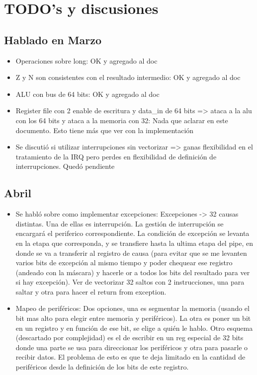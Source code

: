\section{TODO's y discusiones}
\subsection{Hablado en Marzo}
\begin{itemize}
 \item Operaciones sobre long: OK y agregado al doc
 \item Z y N son consistentes con el resultado intermedio: OK y agregado al doc
 \item ALU con bus de 64 bits: OK y agregado al doc
 \item Register file con 2 enable de escritura y data\_in de 64 bits => ataca a la alu con los 64 bits y ataca a la memoria con 32: Nada
 que aclarar en este documento. Esto tiene más que ver con la implementación
 \item Se discutió si utilizar interrupciones sin vectorizar => ganas flexibilidad en el tratamiento de la IRQ pero perdes en
 flexibilidad de definición de interrupciones. Quedó pendiente
\end{itemize}

\subsection{Abril}
\begin{itemize}
 \item Se habló sobre como implementar excepciones:
 Excepciones -> 32 causas distintas. Una de ellas es interrupción. La gestión de interrupción se encargará el periferico correspondiente.
La condición de excepción se levanta en la etapa que corresponda, y se transfiere hasta la ultima etapa del pipe, en donde se va a
transferir al registro de causa (para evitar que se me levanten varios bits de excepción al mismo tiempo y poder chequear ese registro
(andeado con la máscara) y hacerle or a todos los bits del resultado para ver si hay excepción).
Ver de vectorizar 32 saltos con 2 instrucciones, una para saltar y otra para hacer el return from exception.
 \item Mapeo de periféricos: Dos opciones, una es segmentar la memoria (usando el bit mas alto para elegir entre memoria y periféricos).
La otra es poner un bit en un registro y en función de ese bit, se elige a quién le hablo. Otro esquema (descartado por complejidad) es
el de escribir en un reg especial de 32 bits donde una parte se usa para direccionar los periféricos y otra para pasarle o recibir datos.
El problema de esto es que te deja limitado en la cantidad de periféricos desde la definición de los bits de este registro.
\end{itemize}

